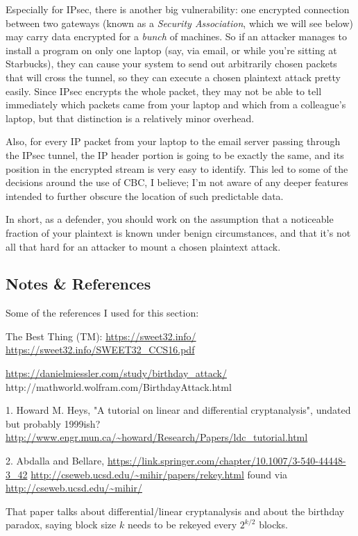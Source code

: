 \documentclass[%
 aip,
 jmp,%
 amsmath,amssymb,
 reprint,%
]{revtex4-1}
\begin{document}
Especially for IPsec, there is another big vulnerability: one
encrypted connection between two gateways (known as a \emph{Security
Association}, which we will see below) may carry data encrypted for a
\emph{bunch} of machines.  So if an attacker manages to install a program
on only one laptop (say, via email, or while you're sitting at
Starbucks), they can cause your system to send out arbitrarily chosen
packets that will cross the tunnel, so they can execute a chosen
plaintext attack pretty easily.  Since IPsec encrypts the whole
packet, they may not be able to tell immediately which packets came
from your laptop and which from a colleague's laptop, but that
distinction is a relatively minor overhead.

Also, for every IP packet from your laptop to the email server passing
through the IPsec tunnel, the IP header portion is going to be exactly
the same, and its position in the encrypted stream is very easy to
identify.  This led to some of the decisions around the use of CBC, I
believe; I'm not aware of any deeper features intended to further
obscure the location of such predictable data.

In short, as a defender, you should work on the assumption that a
noticeable fraction of your plaintext is known under benign
circumstances, and that it's not all that hard for an attacker to
mount a chosen plaintext attack.

\subsection{Notes \& References}

Some of the references I used for this section:

The Best Thing (TM):
\url{https://sweet32.info/}
\url{https://sweet32.info/SWEET32_CCS16.pdf}

\url{https://danielmiessler.com/study/birthday_attack/}
http://mathworld.wolfram.com/BirthdayAttack.html

1. Howard M. Heys, "A tutorial on linear and differential
cryptanalysis", undated but probably 1999ish?
\url{http://www.engr.mun.ca/~howard/Research/Papers/ldc_tutorial.html}

2. Abdalla and Bellare,
\url{https://link.springer.com/chapter/10.1007/3-540-44448-3_42}
\url{http://cseweb.ucsd.edu/~mihir/papers/rekey.html}
found via
\url{http://cseweb.ucsd.edu/~mihir/}

That paper talks about differential/linear cryptanalysis and about the
birthday paradox, saying block size $k$ needs to be rekeyed every
$2^{k/2}$ blocks.
\end{document}
